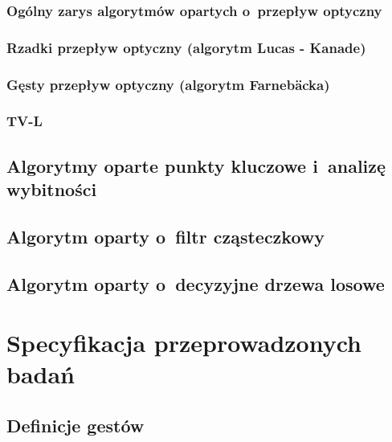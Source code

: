     \subsection{Ogólny zarys algorytmów opartych o~przepływ optyczny}
    \cite{OpticalFlowNonPriori05}
    \cite{LucasKanadeTracker81}

    \subsection{Rzadki przepływ optyczny (algorytm Lucas - Kanade)}
    \cite{OpenCvOpticalFlow04}

    \subsection{Gęsty przepływ optyczny (algorytm Farnebäcka)}
    \cite{GunnarFarneback03}

    \subsection{TV-L}
    \cite{TVL107}

  \section{Algorytmy oparte punkty kluczowe i~analizę wybitności}\label{Subsection_SaliencyKeypoints}
    \cite{SalientPointsTracking05}

  \section{Algorytm oparty o~filtr cząsteczkowy}\label{Subsection_ParticleFilter}
    \cite{ParticleFilter05}
    \cite{FingertipParticleFilter11}

  \section{Algorytm oparty o~decyzyjne drzewa losowe}\label{Subsection_RandomizedTrees}
    \cite{RandomizedTrees06}
    \cite{TwoStageRandomizedTrees11}

\chapter{Specyfikacja przeprowadzonych badań}\label{Chapter_SpecyfikacjaPrzeprowadzonychBadan}

  \section{Definicje gestów}\label{Section_DefinicjeGestow}

